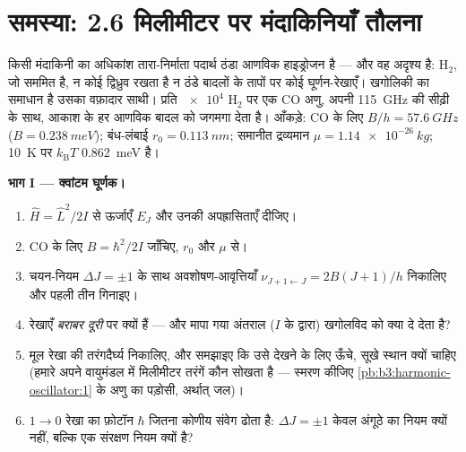 \section{समस्या: 2.6 मिलीमीटर पर मंदाकिनियाँ तौलना}

\begin{problem}[{सप्ताहांत समस्या --- कार्बन मोनोऑक्साइड, रेडियो
खगोलिकी और ठंडा ब्रह्मांड}]\label{pb:b3:quantum-angular-momentum:1}
किसी मंदाकिनी का अधिकांश तारा-निर्माता पदार्थ ठंडा आणविक हाइड्रोजन है
--- और वह अदृश्य है: H$_2$, जो सममित है, न कोई द्विध्रुव रखता है न
ठंडे बादलों के तापों पर कोई घूर्णन-रेखाएँ। खगोलिकी का समाधान है
उसका वफ़ादार साथी। प्रति $\num{e4}$ H$_2$ पर एक CO अणु, अपनी
\qty{115}{GHz} की सीढ़ी के साथ, आकाश के हर आणविक बादल को जगमगा देता
है। आँकड़े: CO के लिए $B/h = \qty{57.6}{GHz}$ ($B =
\qty{0.238}{meV}$); बंध-लंबाई $r_0 = \qty{0.113}{nm}$; समानीत
द्रव्यमान $\mu = \qty{1.14e-26}{kg}$; \qty{10}{K} पर $k_{\text{B}}T$
\qty{0.862}{meV} है।

\medskip\noindent\textbf{भाग I --- क्वांटम घूर्णक।}
\begin{enumerate}
  \item $\hat H = \hat L^2/2I$ से ऊर्जाएँ $E_J$ और उनकी
        अपह्रासिताएँ दीजिए।
  \item CO के लिए $B = \hbar^2/2I$ जाँचिए, $r_0$ और $\mu$ से।
  \item चयन-नियम $\Delta J = \pm1$ के साथ अवशोषण-आवृत्तियाँ
        $\nu_{J+1\leftarrow J} = 2B(J+1)/h$ निकालिए
        और पहली तीन गिनाइए।
  \item रेखाएँ \emph{बराबर दूरी} पर क्यों हैं --- और मापा गया
        अंतराल ($I$ के द्वारा) खगोलविद को क्या दे देता है?
  \item मूल रेखा की तरंगदैर्घ्य निकालिए, और समझाइए कि उसे देखने के
        लिए ऊँचे, सूखे स्थान क्यों चाहिए (हमारे अपने वायुमंडल में
        मिलीमीटर तरंगें कौन सोखता है --- स्मरण कीजिए
        \cref{pb:b3:harmonic-oscillator:1} के अणु का पड़ोसी,
        अर्थात् जल)।
  \item $1 \to 0$ रेखा का फ़ोटॉन $\hbar$ जितना कोणीय
        संवेग ढोता है: $\Delta J = \pm1$ केवल अंगूठे का नियम क्यों
        नहीं, बल्कि एक संरक्षण नियम क्यों है?
\end{enumerate}


\end{problem}
